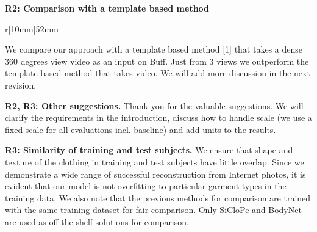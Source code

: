\documentclass[10pt,twocolumn, letterpaper]{article}
\begin{document}
\noindent\textbf{R2: Comparison with a template based method}

\begin{wraptable}[3]{r}[10mm]{52mm}
\vspace*{-4mm}
\hspace*{-8.2mm}
\label{tab:multiview}
\vspace*{-6.8mm}
\end{wraptable}
We compare our approach with a template based method [1] that takes a dense 360 degrees view video as an input on Buff. Just from 3 views we outperform the template based method that takes video. We will add more discussion in the next revision.





 
\noindent\textbf{R2, R3: Other suggestions.}
Thank you for the valuable suggestions. We will clarify the requirements in the introduction, discuss how to handle scale (we use a fixed scale for all evaluations incl. baseline) and add units to the results. 



\noindent\textbf{R3: Similarity of training and test subjects.}
We ensure that shape and texture of the clothing in training and test subjects have little overlap. Since we demonstrate a wide range of successful reconstruction from Internet photos, it is evident that our model is not overfitting to particular garment types in the training data. We also note that the previous methods for comparison are trained with the same training dataset for fair comparison. Only SiCloPe and BodyNet are used as off-the-shelf solutions for comparison.
\end{document}
